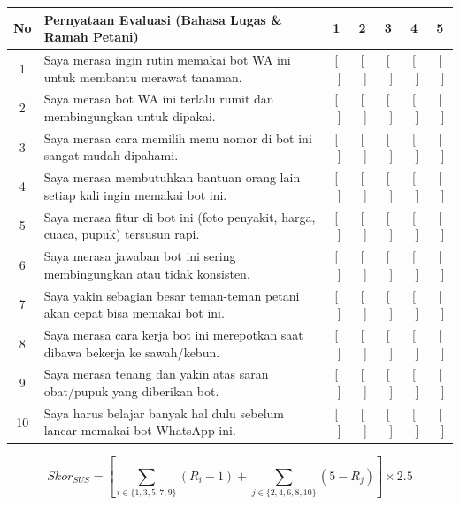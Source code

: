 \documentclass[11pt,a4paper]{article}
\begin{document}
\vspace{0.2cm}
\begin{table}[htbp]
\centering
\small
\begin{tabularx}{\textwidth}{c X c c c c c}
\toprule
\textbf{No} & \textbf{Pernyataan Evaluasi (Bahasa Lugas \& Ramah Petani)} & \textbf{1} & \textbf{2} & \textbf{3} & \textbf{4} & \textbf{5} \\
\midrule
1  & Saya merasa ingin rutin memakai bot WA ini untuk membantu merawat tanaman. & [ \ ] & [ \ ] & [ \ ] & [ \ ] & [ \ ] \\
2  & Saya merasa bot WA ini terlalu rumit dan membingungkan untuk dipakai. & [ \ ] & [ \ ] & [ \ ] & [ \ ] & [ \ ] \\
3  & Saya merasa cara memilih menu nomor di bot ini sangat mudah dipahami. & [ \ ] & [ \ ] & [ \ ] & [ \ ] & [ \ ] \\
4  & Saya merasa membutuhkan bantuan orang lain setiap kali ingin memakai bot ini. & [ \ ] & [ \ ] & [ \ ] & [ \ ] & [ \ ] \\
5  & Saya merasa fitur di bot ini (foto penyakit, harga, cuaca, pupuk) tersusun rapi. & [ \ ] & [ \ ] & [ \ ] & [ \ ] & [ \ ] \\
6  & Saya merasa jawaban bot ini sering membingungkan atau tidak konsisten. & [ \ ] & [ \ ] & [ \ ] & [ \ ] & [ \ ] \\
7  & Saya yakin sebagian besar teman-teman petani akan cepat bisa memakai bot ini. & [ \ ] & [ \ ] & [ \ ] & [ \ ] & [ \ ] \\
8  & Saya merasa cara kerja bot ini merepotkan saat dibawa bekerja ke sawah/kebun. & [ \ ] & [ \ ] & [ \ ] & [ \ ] & [ \ ] \\
9  & Saya merasa tenang dan yakin atas saran obat/pupuk yang diberikan bot. & [ \ ] & [ \ ] & [ \ ] & [ \ ] & [ \ ] \\
10 & Saya harus belajar banyak hal dulu sebelum lancar memakai bot WhatsApp ini. & [ \ ] & [ \ ] & [ \ ] & [ \ ] & [ \ ] \\
\bottomrule
\end{tabularx}
\end{table}

\begin{equation}
    Skor_{SUS} = \left[ \sum_{i \in \{1,3,5,7,9\}} (R_i - 1) + \sum_{j \in \{2,4,6,8,10\}} (5 - R_j) \right] \times 2.5
\end{equation}
\end{document}
